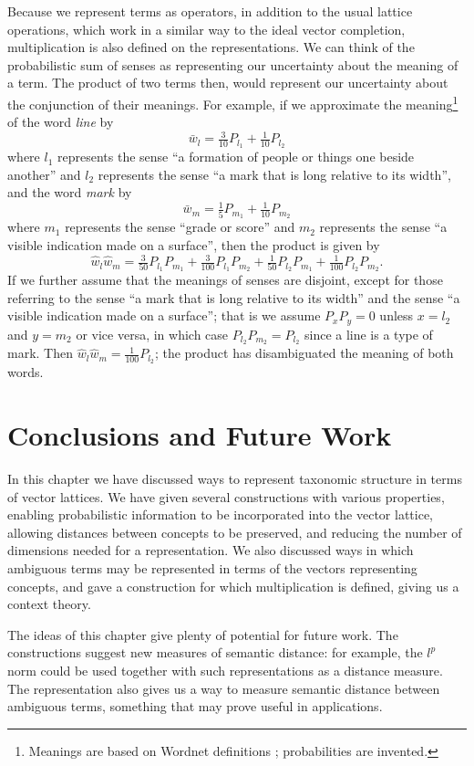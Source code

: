 Because we represent terms as operators, in addition to the usual lattice operations, which work in a similar way to the ideal vector completion, multiplication is also defined on the representations. We can think of the probabilistic sum of senses as representing our uncertainty about the meaning of a term. The product of two terms then, would represent our uncertainty about the conjunction of their meanings. For example, if we approximate the meaning\footnote{Meanings are based on Wordnet definitions \citep{Fellbaum:98}; probabilities are invented.} of the word \emph{line} by
$$\bar{w}_l = \tfrac{3}{10}P_{l_1} + \tfrac{1}{10}P_{l_2}$$
where $l_1$ represents the sense ``a formation of people or things one beside another'' and $l_2$ represents the sense ``a mark that is long relative to its width'', and the word \emph{mark} by
$$\bar{w}_m = \tfrac{1}{5}P_{m_1} + \tfrac{1}{10}P_{m_2}$$
where $m_1$ represents the sense ``grade or score'' and $m_2$ represents the sense ``a visible indication made on a surface'', then the product is given by
$$\hat{w}_l\hat{w}_m = \tfrac{3}{50}P_{l_1}P_{m_1} + \tfrac{3}{100}P_{l_1}P_{m_2} + \tfrac{1}{50}P_{l_2}P_{m_1} + \tfrac{1}{100}P_{l_2}P_{m_2} .$$
If we further assume that the meanings of senses are disjoint, except for those referring to the sense ``a mark that is long relative to its width'' and the sense ``a visible indication made on a surface''; that is we assume $P_xP_y = 0$ unless $x = l_2$ and $y = m_2$ or vice versa, in which case $P_{l_2}P_{m_2} = P_{l_2}$ since a line is a type of mark. Then $\hat{w}_l\hat{w}_m = \tfrac{1}{100}P_{l_2}$; the product has disambiguated the meaning of both words.

\section{Conclusions and Future Work}

In this chapter we have discussed ways to represent taxonomic structure in terms of vector lattices. We have given several constructions with various properties, enabling probabilistic information to be incorporated into the vector lattice, allowing distances between concepts to be preserved, and reducing the number of dimensions needed for a representation. We also discussed ways in which ambiguous terms may be represented in terms of the vectors representing concepts, and gave a construction for which multiplication is defined, giving us a context theory.

The ideas of this chapter give plenty of potential for future work. The constructions suggest new measures of semantic distance: for example, the $l^p$ norm could be used together with such representations as a distance measure. The representation also gives us a way to measure semantic distance between ambiguous terms, something that may prove useful in applications.

